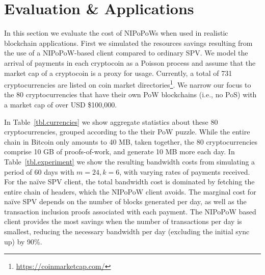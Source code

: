 \section{Evaluation \& Applications}
\label{sec.applications}
In this section we evaluate the cost of NIPoPoWs when used in realistic blockchain applications.
First we simulated the resources savings resulting from the use of a NIPoPoW-based
client compared to ordinary SPV. We model the arrival of payments in each cryptocoin as a Poisson process
and assume that the market cap of a cryptocoin is a proxy for usage. Currently,
a total of 731 cryptocurrencies are listed on coin market
directories\footnote{\url{https://coinmarketcap.com/}}. We narrow our focus to
the 80 cryptocurrencies that have their own PoW blockchains (i.e., no PoS) with
a market cap of over USD \$100,000.

In Table~\ref{tbl.currencies} we show aggregate statistics about these 80
cryptocurrencies, grouped according to the their PoW puzzle. While the entire
chain in Bitcoin only amounts to 40 MB, taken together, the 80 cryptocurrencies
comprise 10 GB of proofs-of-work, and generate 10 MB more each day. In
Table~\ref{tbl.experiment} we show the resulting bandwidth costs from simulating
a period of 60 days with $m=24, k=6$, with varying rates of payments received.
%
For the na\"ive SPV client, the total bandwidth cost is dominated by fetching
the entire chain of headers, which the NIPoPoW client avoids. The marginal
cost for na\"ive SPV depends on the number of blocks generated per day, as well
as the transaction inclusion proofs associated with each payment. The NIPoPoW
based client provides the most savings when the number of transactions per day
is smallest, reducing the necessary bandwidth per day (excluding the initial
sync up) by 90\%.

